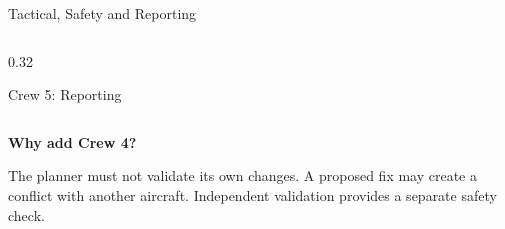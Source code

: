 \begin{frame}{Tactical, Safety and Reporting}
\begin{columns}[T,onlytextwidth]
\begin{column}{0.32\textwidth}
\begin{block}{Crew 5: Reporting}
\end{block}
\end{column}

\end{columns}

\vspace{0.3cm}

\begin{center}
\footnotesize
\textbf{Why add Crew 4?}

The planner must not validate its own changes.
A proposed fix may create a conflict with another aircraft.
Independent validation provides a separate safety check.

\end{center}

\end{frame}
